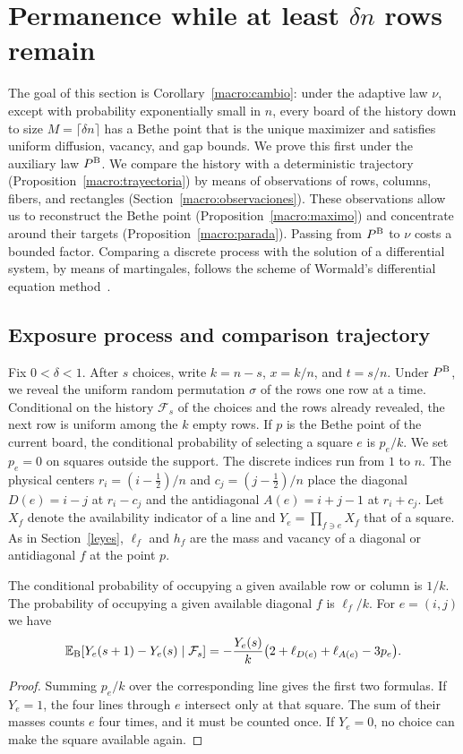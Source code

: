 \section{Permanence while at least \texorpdfstring{$\delta n$}{δn} rows remain}\label{macro}
The goal of this section is Corollary~\ref{macro:cambio}: under the adaptive law $\nu$, except with
probability exponentially small in $n$, every board of the history down to size
$M=\lceil\delta n\rceil$ has a Bethe point that is the unique maximizer and satisfies uniform
diffusion, vacancy, and gap bounds. We prove this first under the auxiliary law $P^{\rm B}$. We
compare the history with a deterministic trajectory (Proposition~\ref{macro:trayectoria}) by means
of observations of rows, columns, fibers, and rectangles (Section~\ref{macro:observaciones}). These
observations allow us to reconstruct the Bethe point (Proposition~\ref{macro:maximo}) and
concentrate around their targets (Proposition~\ref{macro:parada}). Passing from $P^{\rm B}$ to
$\nu$ costs a bounded factor. Comparing a discrete process with the solution of a differential
system, by means of martingales, follows the scheme of Wormald's differential equation
method~\cite{wormald}.

\subsection{Exposure process and comparison trajectory}

Fix $0<\delta<1$. After $s$ choices, write $k=n-s$, $x=k/n$, and $t=s/n$. Under $P^{\rm B}$, we
reveal the uniform random permutation $\sigma$ of the rows one row at a time. Conditional on the
history $\mathcal F_s$ of the choices and the rows already revealed, the next row is uniform among
the $k$ empty rows. If $p$ is the Bethe point of the current board, the conditional probability of
selecting a square $e$ is $p_e/k$. We set $p_e=0$ on squares outside the support. The discrete
indices run from $1$ to $n$. The physical centers $r_i=(i-\tfrac12)/n$ and $c_j=(j-\tfrac12)/n$
place the diagonal $D(e)=i-j$ at $r_i-c_j$ and the antidiagonal $A(e)=i+j-1$ at $r_i+c_j$.
Let $X_f$ denote the availability indicator of a line and $Y_e=\prod_{f\ni e}X_f$ that of a square.
As in Section~\ref{leyes}, $\ell_f$ and $h_f$ are the mass and vacancy of a diagonal or antidiagonal
$f$ at the point $p$.

\begin{lema}\label{macro:casilla}
The conditional probability of occupying a given available row or column is $1/k$. The probability of
occupying a given available diagonal $f$ is $\ell_f/k$. For $e=(i,j)$ we have
\[
 \mathbb{E}_{\rm B}[Y_e(s+1)-Y_e(s)\mid\mathcal F_s]
 =-\frac{Y_e(s)}{k}\bigl(2+\ell_{D(e)}+\ell_{A(e)}-3p_e\bigr).
\]
\end{lema}
\begin{proof}
Summing $p_e/k$ over the corresponding line gives the first two formulas. If $Y_e=1$, the four
lines through $e$ intersect only at that square. The sum of their masses counts $e$ four times, and
it must be counted once. If $Y_e=0$, no choice can make the square available again.
\end{proof}

